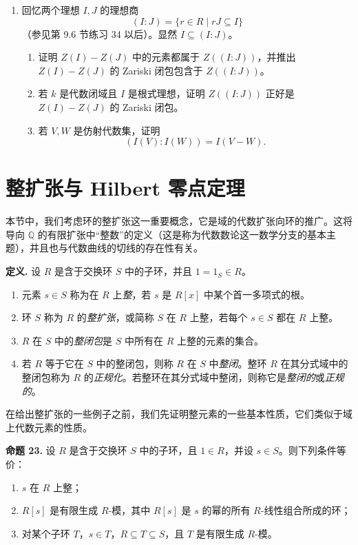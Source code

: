 \begin{enumerate}[label=\arabic*.]
	\item 回忆两个理想 $I,J$ 的理想商
	\[
	(I:J)=\{r\in R\mid rJ\subseteq I\}
	\]
	（参见第 9.6 节练习 34 以后）。显然 $I\subseteq(I:J)$。
	\begin{enumerate}[label=(\alph*)]
		\item 证明 $Z(I)-Z(J)$ 中的元素都属于 $Z((I:J))$，并推出 $Z(I)-Z(J)$ 的 Zariski 闭包包含于 $Z((I:J))$。
		\item 若 $k$ 是代数闭域且 $I$ 是根式理想，证明 $Z((I:J))$ 正好是 $Z(I)-Z(J)$ 的 Zariski 闭包。
		\item 若 $V,W$ 是仿射代数集，证明
		\[
		(I(V):I(W))=I(V-W).
		\]
	\end{enumerate}
\end{enumerate}
\section{整扩张与 Hilbert 零点定理}

本节中，我们考虑环的整扩张这一重要概念，它是域的代数扩张向环的推广。这将导向 $\mathbb Q$ 的有限扩张中“整数”的定义（这是称为代数数论这一数学分支的基本主题），并且也与代数曲线的切线的存在性有关。

\noindent\textbf{定义.} 设 $R$ 是含于交换环 $S$ 中的子环，并且 $1=1_S\in R$。
\begin{enumerate}[label=(\arabic*)]
	\item 元素 $s\in S$ 称为在 $R$ 上\emph{整}，若 $s$ 是 $R[x]$ 中某个首一多项式的根。
	\item 环 $S$ 称为 $R$ 的\emph{整扩张}，或简称 $S$ 在 $R$ 上整，若每个 $s\in S$ 都在 $R$ 上整。
	\item $R$ 在 $S$ 中的\emph{整闭包}是 $S$ 中所有在 $R$ 上整的元素的集合。
	\item 若 $R$ 等于它在 $S$ 中的整闭包，则称 $R$ 在 $S$ 中\emph{整闭}。整环 $R$ 在其分式域中的整闭包称为 $R$ 的\emph{正规化}。若整环在其分式域中整闭，则称它是\emph{整闭的}或\emph{正规的}。
\end{enumerate}

在给出整扩张的一些例子之前，我们先证明整元素的一些基本性质，它们类似于域上代数元素的性质。

\noindent\textbf{命题 23.} 设 $R$ 是含于交换环 $S$ 中的子环，且 $1\in R$，并设 $s\in S$。则下列条件等价：
\begin{enumerate}[label=(\arabic*)]
	\item $s$ 在 $R$ 上整；
	\item $R[s]$ 是有限生成 $R$-模，其中 $R[s]$ 是 $s$ 的幂的所有 $R$-线性组合所成的环；
	\item 对某个子环 $T$，$s\in T$，$R\subseteq T\subseteq S$，且 $T$ 是有限生成 $R$-模。
\end{enumerate}

